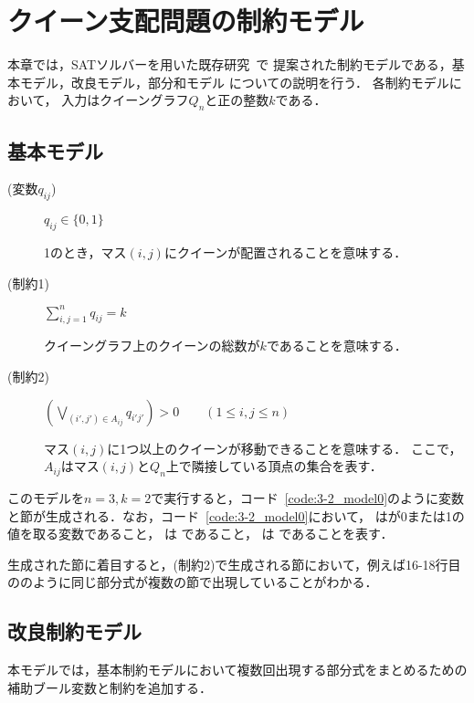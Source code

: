 \chapter{クイーン支配問題の制約モデル}\label{chap:constraint}
本章では，SATソルバーを用いた既存研究~\cite{yamamoto21}で
提案された制約モデルである，基本モデル，改良モデル，部分和モデル
についての説明を行う．
各制約モデルにおいて，
入力はクイーングラフ$Q_{n}$と正の整数$k$である．

\section{基本モデル}
\begin{description}
 \item[(変数$q_{ij}$)] $q_{ij} \in \{0,1\}$ \par
1のとき，マス$(i,j)$にクイーンが配置されることを意味する．
 \item[(制約1)] $\sum\limits_{i,j=1}^{n} q_{ij} = k$ \par
クイーングラフ上のクイーンの総数が$k$であることを意味する．
 \item[(制約2)] $(\bigvee\limits_{(i',j')\in A_{ij}} q_{i'j'}) >0 \qquad (1 \leq i,j \leq n)$ \par
マス$(i,j)$に1つ以上のクイーンが移動できることを意味する．
ここで，$A_{ij}$はマス$(i,j)$と$Q_n$上で隣接している頂点の集合を表す．
\end{description}

このモデルを$n=3,k=2$で実行すると，コード~\ref{code:3-2_model0}のように変数と節が生成される．なお，コード~\ref{code:3-2_model0}において，    はが0または1の値を取る変数であること，  は  であること，  は  であることを表す．

生成された節に着目すると，(制約2)で生成される節において，例えば16-18行目ののように同じ部分式が複数の節で出現していることがわかる．


\newpage
\section{改良制約モデル}
本モデルでは，基本制約モデルにおいて複数回出現する部分式をまとめるための補助ブール変数と制約を追加する．

